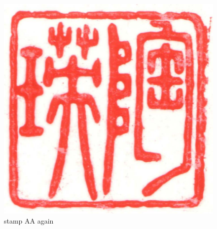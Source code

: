 \documentclass[
  letterpaper,
  DIV=11,
  numbers=noendperiod]{scrartcl}
\begin{document}
\begin{figure}

{\centering \includegraphics{stamp1a.jpg}

}

\caption{\label{fig-stamp3-again}stamp AA again}

\end{figure}
\end{document}
